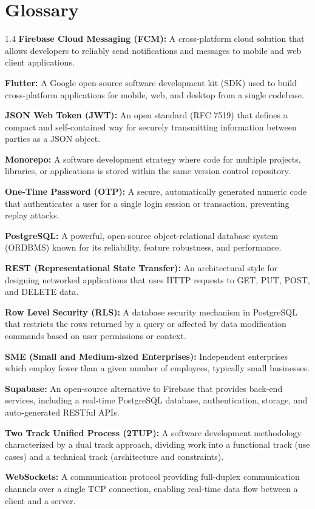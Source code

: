 \chapter*{Glossary}
\begin{spacing}{1.4}
\noindent\textbf{Firebase Cloud Messaging (FCM):} A cross-platform cloud solution that allows developers to reliably send notifications and messages to mobile and web client applications.

\noindent\textbf{Flutter:} A Google open-source software development kit (SDK) used to build cross-platform applications for mobile, web, and desktop from a single codebase.

\noindent\textbf{JSON Web Token (JWT):} An open standard (RFC 7519) that defines a compact and self-contained way for securely transmitting information between parties as a JSON object.

\noindent\textbf{Monorepo:} A software development strategy where code for multiple projects, libraries, or applications is stored within the same version control repository.

\noindent\textbf{One-Time Password (OTP):} A secure, automatically generated numeric code that authenticates a user for a single login session or transaction, preventing replay attacks.

\noindent\textbf{PostgreSQL:} A powerful, open-source object-relational database system (ORDBMS) known for its reliability, feature robustness, and performance.

\noindent\textbf{REST (Representational State Transfer):} An architectural style for designing networked applications that uses HTTP requests to GET, PUT, POST, and DELETE data.

\noindent\textbf{Row Level Security (RLS):} A database security mechanism in PostgreSQL that restricts the rows returned by a query or affected by data modification commands based on user permissions or context.

\noindent\textbf{SME (Small and Medium-sized Enterprises):} Independent enterprises which employ fewer than a given number of employees, typically small businesses.

\noindent\textbf{Supabase:} An open-source alternative to Firebase that provides back-end services, including a real-time PostgreSQL database, authentication, storage, and auto-generated RESTful APIs.

\noindent\textbf{Two Track Unified Process (2TUP):} A software development methodology characterized by a dual track approach, dividing work into a functional track (use cases) and a technical track (architecture and constraints).

\noindent\textbf{WebSockets:} A communication protocol providing full-duplex communication channels over a single TCP connection, enabling real-time data flow between a client and a server.
\end{spacing}
